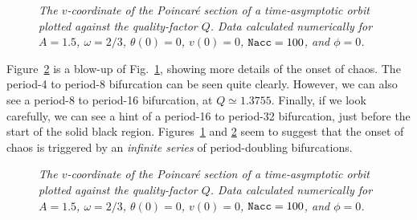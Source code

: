 \begin{figure}
\epsfysize=3.5in
\centerline{}
\caption{\em The $v$-coordinate of the Poincar\'{e} section of a time-asymptotic orbit
plotted against the quality-factor $Q$. Data
 calculated numerically for
$A=1.5$, $\omega=2/3$, $\theta(0)=0$, $v(0)=0$, ${\tt Nacc} =100$, and $\phi=0$.}\label{f34}
\end{figure}

Figure~\ref{f35} is a blow-up of Fig.~\ref{f34}, showing more details of the onset of
chaos. The period-4 to period-8 bifurcation can be seen quite clearly. However,
we can also see a period-8 to period-16 bifurcation, at $Q\simeq 1.3755$. Finally,
if we look carefully, we can see a hint of a period-16 to period-32 bifurcation, just
before the start of the solid black region.
 Figures~\ref{f34} and \ref{f35} seem to suggest that the
onset of chaos is triggered by an {\em infinite series} of period-doubling bifurcations.

\begin{figure}
\epsfysize=3.5in
\centerline{}
\caption{\em The $v$-coordinate of the Poincar\'{e} section of a time-asymptotic orbit
plotted against the quality-factor $Q$. Data
calculated numerically for
$A=1.5$, $\omega=2/3$, $\theta(0)=0$, $v(0)=0$, ${\tt Nacc} =100$,
 and $\phi=0$.}\label{f35}
\end{figure}

